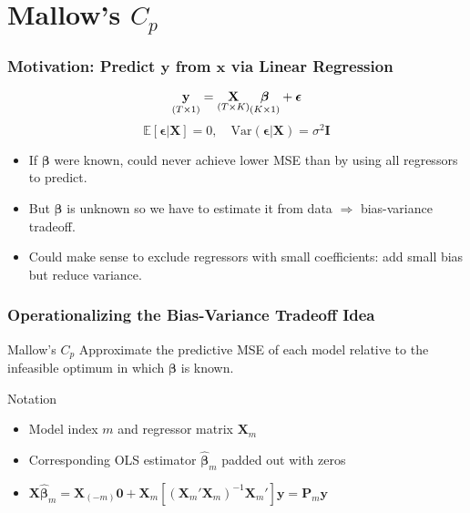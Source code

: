 \section{Mallow's $C_p$}
\begin{frame}
  \frametitle{Motivation: Predict $\mathbf{y}$ from $\mathbf{x}$ via Linear Regression}

  \[\underset{\small(T\times1)}{\textbf{y}} = \underset{(T\times K)}{\mathbf{X} }\underset{(K\times 1)}{\boldsymbol{\beta}} + \boldsymbol{\epsilon}\]
\small
\[\mathbb{E}[\boldsymbol{\epsilon}|\mathbf{X}] = 0 ,\quad
\text{Var}(\boldsymbol{\epsilon}|\mathbf{X}) = \sigma^2 \mathbf{I}\]
\normalsize

\pause

\begin{itemize}
  \item If $\boldsymbol{\beta}$ were known, could never achieve lower MSE than by using all regressors to predict.\pause
  \item But $\boldsymbol{\beta}$ is unknown so we have to estimate it from data $\Rightarrow$ bias-variance tradeoff.\pause
  \item Could make sense to exclude regressors with small coefficients: add small bias but reduce variance.
\end{itemize}
\end{frame}
\begin{frame}
  \frametitle{Operationalizing the Bias-Variance Tradeoff Idea}

  \begin{alertblock}{Mallow's $C_p$}
    Approximate the predictive MSE of each model relative to the infeasible optimum in which $\boldsymbol{\beta}$ is known. 
  \end{alertblock}

  \pause

  \begin{block}{Notation}
    \begin{itemize}
      \item Model index $m$ and regressor matrix $\mathbf{X}_m$
      \item Corresponding OLS estimator $\boldsymbol{\widehat{\beta}}_m$ padded out with zeros
      \item $\mathbf{X} \widehat{\boldsymbol{\beta}}_m = \mathbf{X}_{(-m)}\mathbf{0} + \mathbf{X}_m\left[ (\mathbf{X}_m'\mathbf{X}_m)^{-1}\mathbf{X}_m'\right] \mathbf{y} = \mathbf{P}_m \mathbf{y}$
    \end{itemize}
  \end{block}

\end{frame}
